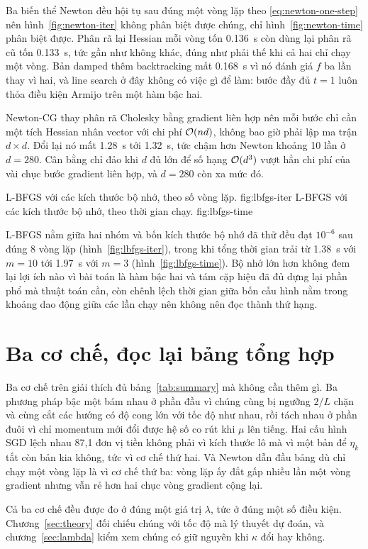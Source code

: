 Ba biến thể Newton đều hội tụ sau đúng một vòng lặp theo
\eqref{eq:newton-one-step} nên hình~\ref{fig:newton-iter} không phân biệt được
chúng, chỉ hình~\ref{fig:newton-time} phân biệt được. Phân rã lại Hessian mỗi
vòng tốn \SI{0.136}{\second} còn dùng lại phân rã cũ tốn \SI{0.133}{\second}, tức
gần như không khác, đúng như phải thế khi cả hai chỉ chạy một vòng. Bản damped
thêm backtracking mất \SI{0.168}{\second} vì nó đánh giá $f$ ba lần thay vì hai,
và line search ở đây không có việc gì để làm: bước đầy đủ $t = 1$ luôn thỏa điều
kiện Armijo trên một hàm bậc hai.

Newton-CG thay phân rã Cholesky bằng gradient liên hợp nên mỗi bước chỉ cần một
tích Hessian nhân vector với chi phí $\mathcal{O}(nd)$, không bao giờ phải lập ma trận
$d \times d$. Đổi lại nó mất \SI{1.28}{\second} tới \SI{1.32}{\second}, tức chậm
hơn Newton khoảng 10 lần ở $d = 280$. Cân bằng chỉ đảo khi $d$ đủ lớn để số hạng
$\mathcal{O}(d^3)$ vượt hẳn chi phí của vài chục bước gradient liên hợp, và
$d = 280$ còn xa mức đó.

  {L-BFGS với các kích thước bộ nhớ, theo số vòng lặp.}
  {fig:lbfgs-iter}
  {L-BFGS với các kích thước bộ nhớ, theo thời gian chạy.}
  {fig:lbfgs-time}

L-BFGS nằm giữa hai nhóm và bốn kích thước bộ nhớ đã thử đều đạt $10^{-6}$ sau
đúng 8 vòng lặp (hình~\ref{fig:lbfgs-iter}), trong khi tổng thời gian trải từ
\SI{1.38}{\second} với $m = 10$ tới \SI{1.97}{\second} với $m = 3$
(hình~\ref{fig:lbfgs-time}). Bộ nhớ lớn hơn không đem lại lợi ích nào vì bài
toán là hàm bậc hai và tám cặp hiệu đã đủ dựng lại phần phổ mà thuật toán cần,
còn chênh lệch thời gian giữa bốn cấu hình nằm trong khoảng dao động giữa các lần
chạy nên không nên đọc thành thứ hạng.

\section{Ba cơ chế, đọc lại bảng tổng hợp}
\label{sec:mech-summary}

Ba cơ chế trên giải thích đủ bảng~\ref{tab:summary} mà không cần thêm gì. Ba
phương pháp bậc một bám nhau ở phần đầu vì chúng cùng bị ngưỡng $2/L$ chặn và
cùng cắt các hướng có độ cong lớn với tốc độ như nhau, rồi tách nhau ở phần đuôi
vì chỉ momentum mới đổi được hệ số co rút khi $\mu$ lên tiếng. Hai cấu hình SGD
lệch nhau 87,1 đơn vị tiền không phải vì kích thước lô mà vì một bản để $\eta_k$
tắt còn bản kia không, tức vì cơ chế thứ hai. Và Newton dẫn đầu bảng dù chỉ chạy
một vòng lặp là vì cơ chế thứ ba: vòng lặp ấy đắt gấp nhiều lần một vòng gradient
nhưng vẫn rẻ hơn hai chục vòng gradient cộng lại.

Cả ba cơ chế đều được đo ở đúng một giá trị $\lambda$, tức ở đúng một số điều
kiện. Chương~\ref{sec:theory} đối chiếu chúng với tốc độ mà lý thuyết dự đoán, và
chương~\ref{sec:lambda} kiểm xem chúng có giữ nguyên khi $\kappa$ đổi hay không.
